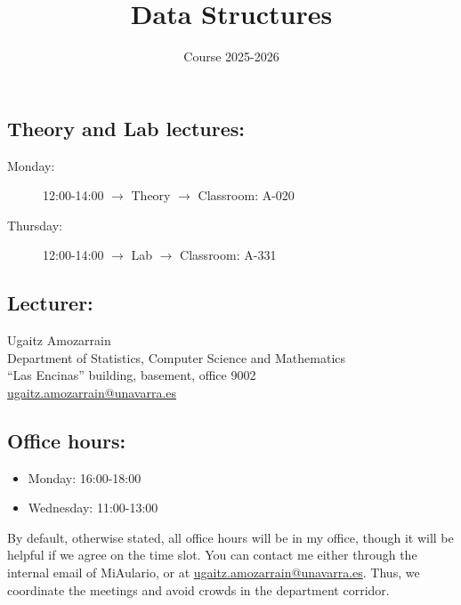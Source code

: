 \documentclass[spanish,12pt,a4paper]{article}
\title{Data Structures}
\date{Course 2025-2026}
\begin{document}
\maketitle
\subsection*{Theory and Lab lectures:}
\begin{description}
\item[Monday:] 12:00-14:00 $\rightarrow$ Theory $\rightarrow$ Classroom: A-020
\item[Thursday:] 12:00-14:00 $\rightarrow$ Lab $\rightarrow$ Classroom: A-331
\end{description}

\subsection*{Lecturer:}
\noindent Ugaitz Amozarrain\\
Department of Statistics, Computer Science and Mathematics\\
``Las Encinas'' building, basement, office 9002\\
\href{mailto:ugaitz.amozarrain@unavarra.es}{ugaitz.amozarrain@unavarra.es} 

\subsection*{Office hours:}
\begin{itemize}
\item Monday: 16:00-18:00
\item Wednesday: 11:00-13:00
\end{itemize}

By default, otherwise stated, all office hours will be in my office, though it will be helpful if we agree on the time slot. 
You can contact me either through the internal email of MiAulario, or at \href{mailto:ugaitz.amozarrain@unavarra.es}{ugaitz.amozarrain@unavarra.es}.
Thus, we coordinate the meetings and avoid crowds in the department corridor.

\newpage
\end{document}
